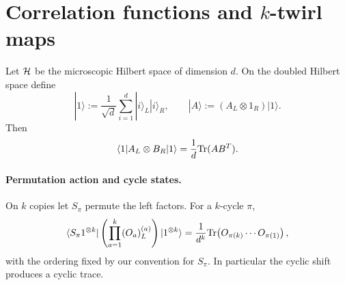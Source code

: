 \documentclass{article}
\theoremstyle{definition}
\begin{document}
\appendix

\section{Correlation functions and $k$-twirl maps}

Let ${\cal H}$ be the microscopic Hilbert space of dimension $d$.  On the
doubled Hilbert space define
\begin{equation}
    |1\rangle
    :=\frac1{\sqrt d}\sum_{i=1}^d|i\rangle_L|i\rangle_R,
    \qquad
    |A\rangle:=(A_L\otimes1_R)|1\rangle.
\end{equation}
Then
\begin{equation}
    \langle1|A_L\otimes B_R|1\rangle
    =\frac1d{\rm Tr}(AB^T).
\end{equation}

\paragraph{Permutation action and cycle states.}
On $k$ copies let $S_\pi$ permute the left factors.  For a $k$-cycle
$\pi$,
\begin{equation}
    \langle S_\pi1^{\otimes k}|
    \left(\prod_{a=1}^k(O_a)_L^{(a)}\right)
    |1^{\otimes k}\rangle
    =\frac1{d^k}
      {\rm Tr}\!\left(O_{\pi(k)}\cdots O_{\pi(1)}\right),
\end{equation}
with the ordering fixed by our convention for $S_\pi$.  In particular the
cyclic shift produces a cyclic trace.
\end{document}
